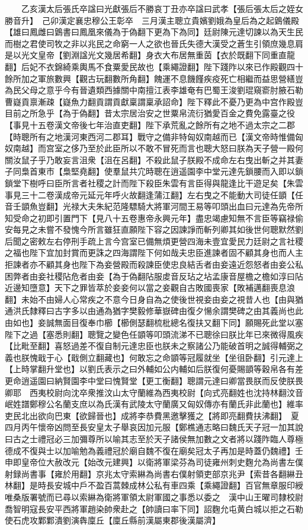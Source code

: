 　　乙亥漢太后張氏卒諡曰光獻張后不勝哀丁丑亦卒諡曰武孝【張后張太后之姪女勝音升】　己卯漢定襄忠穆公王彰卒　三月漢主聰立貴嬪劉娥為皇后為之起䳨儀殿【雄曰鳳雌曰䳨書曰鳳凰來儀為于偽翻下更為下為同】廷尉陳元達切諫以為天生民而樹之君使司牧之非以兆民之命窮一人之欲也晉氏失德大漢受之蒼生引領庶幾息肩是以光文皇帝【劉淵諡光文幾居希翻】身衣大布居無重茵【衣於既翻下同重直龍翻】后妃不衣錦綺乘輿馬不食粟愛民故也【乘繩證翻】陛下踐阼以來已作殿觀四十餘所加之軍旅數興【觀古玩翻數所角翻】餽運不息饑饉疾疫死亡相繼而益思營繕豈為民父母之意乎今有晉遺類西據關中南擅江表李雄奄有巴蜀王浚劉琨窺窬肘腋石勒曹嶷貢禀漸疎【嶷魚力翻貢謂貢獻稟謂稟承詔命】陛下釋此不憂乃更為中宫作殿豈目前之所急乎【為于偽翻】昔太宗居治安之世粟帛流衍猶愛百金之費免露臺之役【事見十五卷漢文帝後七年治直吏翻】陛下承荒亂之餘所有之地不過太宗之二郡【時聰所有之地漢河東西河二郡耳】戰守之備非特匈奴南越而已【漢文帝時惟備匈奴南越】而宫室之侈乃至於此臣所以不敢不冒死而言也聰大怒曰朕為天子營一殿何關汝鼠子乎乃敢妄言沮衆【沮在呂翻】不殺此鼠子朕殿不成命左右曳出斬之并其妻子同梟首東市【梟堅堯翻】使羣鼠共宂時聰在逍遥園李中堂元達先鎖腰而入即以鎖鎖堂下樹呼曰臣所言者社稷之計而陛下殺臣朱雲有言臣得與龍逢比干遊足矣【朱雲事見三十二卷漢成帝元延元年呼火故翻逢蒲江翻】左右曳之不能動大司徒任顗【任音壬顗魚豈翻】光禄大夫朱紀范隆驃騎大將軍河間王易等叩頭出血曰元達為先帝所知受命之初即引置門下【見八十五卷惠帝永興元年】盡忠竭慮知無不言臣等竊禄偷安每見之未嘗不發愧今所言雖狂直願陛下容之因諫諍而斬列卿其如後世何聰默然劉后聞之密敕左右停刑手疏上言今宫室已備無煩更營四海未壹宜愛民力廷尉之言社稷之福也陛下宜加封賞而更誅之四海謂陛下何如哉夫忠臣進諫者固不顧其身也而人主拒諫者亦不顧其身也陛下為妾營殿而殺諫臣使忠良結舌者由妾遠近怨怒者由妾公私困弊者由妾社稷阽危者由妾【為于偽翻阽服䖍音反玷之坫孟康音屋檐之檐如淳曰阽近邊知墮意】天下之罪皆萃於妾妾何以當之妾觀自古敗國喪家【敗補邁翻喪息浪翻】未始不由婦人心常疾之不意今日身自為之使後世視妾由妾之視昔人也【由與猶通洪氏隸釋曰古字多以由通為猶字樊毅修華嶽碑由復夕愓余謂樊碑之由其義尚也此由如也】妾誠無面目復奉巾櫛【櫛側瑟翻梳枇總名復扶又翻下同】願賜死此堂以塞陛下之過【塞悉則翻】聰覽之變色任顗等叩頭流涕不已聰徐曰朕比年已來微得風疾【比毗至翻】喜怒過差不復自制元達忠臣也朕未之察諸公乃能破首明之誠得輔弼之義也朕愧戢于心【戢側立翻藏也】何敢忘之命顗等冠履就坐【坐徂卧翻】引元達上【上時掌翻升堂也】以劉氏表示之曰外輔如公内輔如后朕復何憂賜顗等穀帛各有差更命逍遥園曰納賢園李中堂曰愧賢堂【更工衡翻】聰謂元達曰卿當畏朕而反使朕畏卿耶　西夷校尉向沈卒衆推汶山太守蘭維為西夷校尉【向式亮翻姓也沈持林翻汶音岷姓譜鄭穆公名蘭支庶以為氏漢有武陵太守蘭廣又匈奴傳亦有蘭氏非此蘭也】維率吏民北出欲向巴東【欲歸晉也】成將李恭費黑邀擊獲之【將即亮翻費扶沸翻】　夏四月丙午懷帝凶問至長安皇太子舉哀因加元服【鄭樵通志略曰魏氏天子冠一加其說曰古之士禮冠必三加彌尊所以喻其志至於天子諸侯無加數之文者將以踐阼臨人尊極德成不復與士以加喻勉為義禮冠於廟自魏不復在廟矣冠太子再加是時蓋仍魏禮】壬申即皇帝位大赦改元【始改元建興】以衛將軍梁芬為司徒雍州刺史麴允為尚書左僕射録尚書事【雍於用翻】京兆太守索綝為尚書右僕射領吏部京兆尹【索昔各翻綝丑林翻】是時長安城中戶不盈百蒿棘成林公私有車四乘【乘繩證翻】百官無章服印綬唯桑版署號而已尋以索綝為衛將軍領太尉軍國之事悉以委之　漢中山王曜司隸校尉喬智明寇長安平西將軍趙染帥衆赴之【帥讀曰率下同】詔麴允屯黄白城以拒之石勒使石虎攻鄴鄴潰劉演犇廩丘【廩丘縣前漢屬東郡後漢屬濟】

